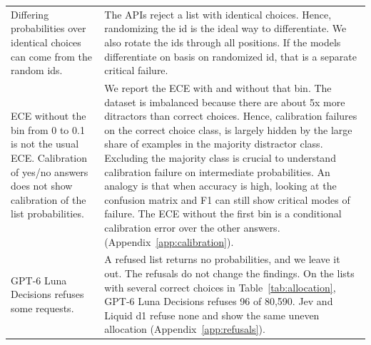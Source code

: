 \begin{tabular}{p{}p{}}
\addlinespace
Differing probabilities over identical choices can come from the random ids.
& The APIs reject a list with identical choices. Hence, randomizing the id is the ideal way to differentiate. We also rotate the ids through all positions. If the models differentiate on basis on randomized id, that is a separate critical failure.
\\

\addlinespace
ECE without the bin from 0 to 0.1 is not the usual ECE. Calibration of yes/no answers does not show calibration of the list probabilities.
& We report the ECE with and without that bin. The dataset is imbalanced because there are about 5x more ditractors than correct choices. Hence, calibration failures on the correct choice class, is largely hidden by the large share of examples in the majority distractor class. Excluding the majority class is crucial to understand calibration failure on intermediate probabilities. An analogy is that when accuracy is high, looking at the confusion matrix and F1 can still show critical modes of failure.
The ECE without the first bin is a conditional calibration error over the other answers. (Appendix~\ref{app:calibration}).
\\

\addlinespace
GPT-6 Luna Decisions refuses some requests.
& A refused list returns no probabilities, and we leave it out. The refusals do not change the findings. On the lists with several correct choices in Table~\ref{tab:allocation}, GPT-6 Luna Decisions refuses 96 of 80,590. Jev and Liquid d1 refuse none and show the same uneven allocation (Appendix~\ref{app:refusals}).
\\

\bottomrule
\end{tabular}%
